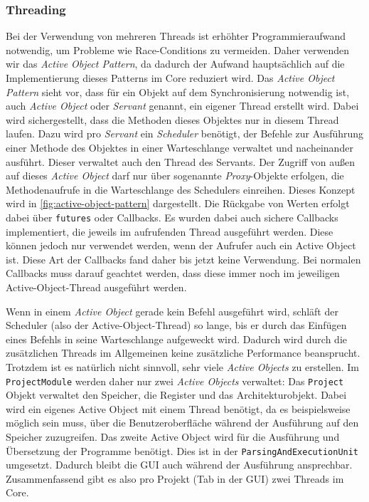 \subsubsection{Threading}

Bei der Verwendung von mehreren Threads ist erhöhter Programmieraufwand
notwendig, um Probleme wie Race-Conditions zu vermeiden. Daher verwenden wir das
\emph{Active Object Pattern}, da dadurch der Aufwand hauptsächlich auf die
Implementierung dieses Patterns im Core reduziert wird. Das \emph{Active
Object Pattern} sieht vor, dass für ein Objekt auf dem Synchronisierung
notwendig ist, auch \emph{Active Object} oder \emph{Servant} genannt, ein
eigener Thread erstellt wird. Dabei wird sichergestellt, dass die Methoden
dieses Objektes nur in diesem Thread laufen. Dazu wird pro \emph{Servant} ein
\emph{Scheduler} benötigt, der Befehle zur Ausführung einer Methode des
Objektes in einer Warteschlange verwaltet und nacheinander ausführt. Dieser
verwaltet auch den Thread des Servants. Der Zugriff von außen auf dieses
\emph{Active Object} darf nur über sogenannte \emph{Proxy}-Objekte erfolgen,
die Methodenaufrufe in die Warteschlange des Schedulers einreihen. Dieses
Konzept wird in \autoref{fig:active-object-pattern} dargestellt. Die Rückgabe
von Werten erfolgt dabei über \texttt{futures} oder Callbacks. Es wurden dabei
auch sichere Callbacks implementiert, die jeweils im aufrufenden Thread
ausgeführt werden. Diese können jedoch nur verwendet werden, wenn der Aufrufer
auch ein Active Object ist. Diese Art der Callbacks fand daher bis jetzt keine
Verwendung. Bei normalen Callbacks muss darauf geachtet werden, dass diese immer
noch im jeweiligen Active-Object-Thread ausgeführt werden.

Wenn in einem \emph{Active Object} gerade kein Befehl ausgeführt wird, schläft
der Scheduler (also der Active-Object-Thread) so lange, bis er durch das
Einfügen eines Befehls in seine Warteschlange aufgeweckt wird. Dadurch wird
durch die zusätzlichen Threads im Allgemeinen keine zusätzliche Performance
beansprucht. Trotzdem ist es natürlich nicht sinnvoll, sehr viele \emph{Active
Objects} zu erstellen. Im \texttt{ProjectModule} werden daher nur zwei
\emph{Active Objects} verwaltet: Das \texttt{Project} Objekt verwaltet den
Speicher, die Register und das Architekturobjekt. Dabei wird ein eigenes Active
Object mit einem Thread benötigt, da es beispielsweise möglich sein muss, über
die Benutzeroberfläche während der Ausführung auf den Speicher zuzugreifen. Das
zweite Active Object wird für die Ausführung und Übersetzung der Programme
benötigt. Dies ist in der \texttt{ParsingAndExecutionUnit} umgesetzt. Dadurch
bleibt die GUI auch während der Ausführung ansprechbar. Zusammenfassend gibt es
also pro Projekt (Tab in der GUI) zwei Threads im Core.

